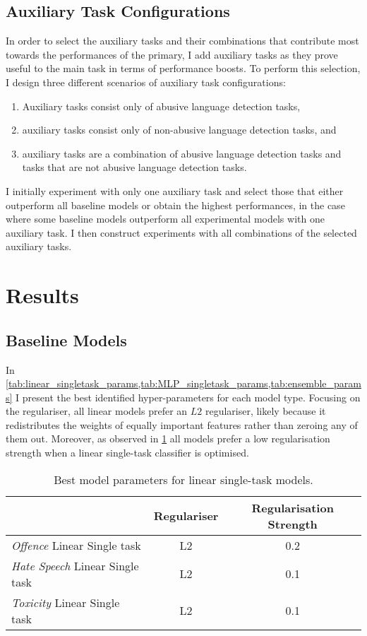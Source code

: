 \subsection{Auxiliary Task Configurations}\label{sub:aux_task_selection}
In order to select the auxiliary tasks and their combinations that contribute most towards the performances of the primary, I add auxiliary tasks as they prove useful to the main task in terms of performance boosts.
To perform this selection, I design three different scenarios of auxiliary task configurations:

\begin{enumerate}
  \item Auxiliary tasks consist only of abusive language detection tasks,
  \item auxiliary tasks consist only of non-abusive language detection tasks, and
  \item auxiliary tasks are a combination of abusive language detection tasks and tasks that are not abusive language detection tasks.
\end{enumerate}

I initially experiment with only one auxiliary task and select those that either outperform all baseline models or obtain the highest performances, in the case where some baseline models outperform all experimental models with one auxiliary task.
I then construct experiments with all combinations of the selected auxiliary tasks.

\section{Results}

\subsection{Baseline Models}

In \cref{tab:linear_singletask_params,tab:MLP_singletask_params,tab:ensemble_params} I present the best identified hyper-parameters for each model type.
Focusing on the regulariser, all linear models prefer an $L2$ regulariser, likely because it redistributes the weights of equally important features rather than zeroing any of them out.
Moreover, as observed in \cref{tab:linear_singletask_params} all models prefer a low regularisation strength when a linear single-task classifier is optimised.

\begin{table}[h]
  \centering
  \begin{tabular}{l|cc}
                                            & Regulariser & Regularisation Strength \\\hline
    \textit{Offence} Linear Single task     & L2          & 0.2                     \\
    \textit{Hate Speech} Linear Single task & L2          & 0.1                     \\
    \textit{Toxicity} Linear Single task    & L2          & 0.1
  \end{tabular}
  \caption{Best model parameters for linear single-task models.}
  \label{tab:linear_singletask_params}
\end{table}

